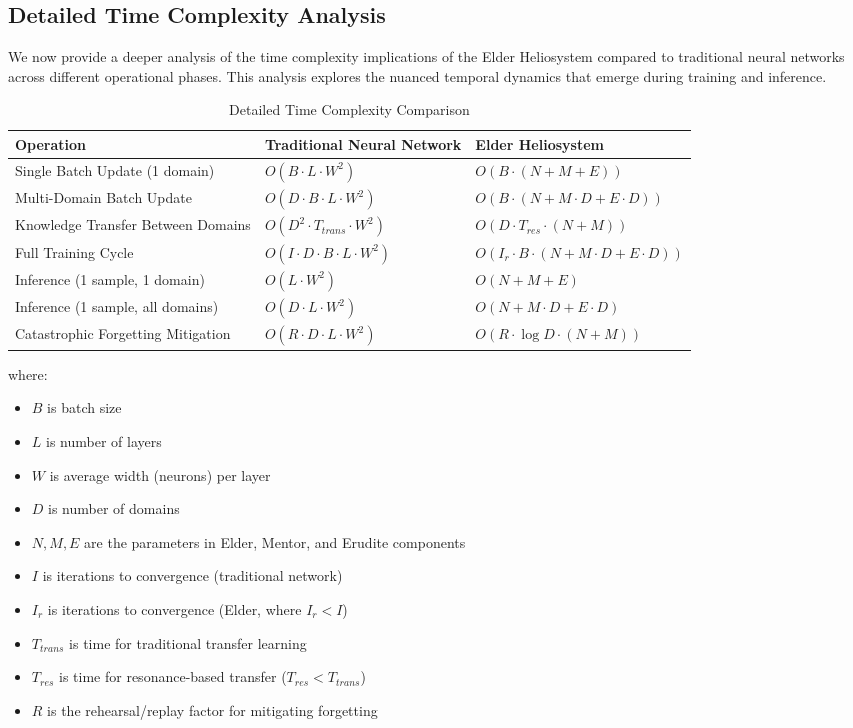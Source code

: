 \subsection{Detailed Time Complexity Analysis}

We now provide a deeper analysis of the time complexity implications of the Elder Heliosystem compared to traditional neural networks across different operational phases. This analysis explores the nuanced temporal dynamics that emerge during training and inference.

\begin{table}[h]
\centering
\small
\caption{Detailed Time Complexity Comparison}
\label{tab:time_complexity}
\begin{tabular}{|p{4cm}|p{5cm}|p{5cm}|}
\hline
\textbf{Operation} & \textbf{Traditional Neural Network} & \textbf{Elder Heliosystem} \\
\hline
Single Batch Update (1 domain) & $O(B \cdot L \cdot W^2)$ & $O(B \cdot (N + M + E))$ \\
\hline
Multi-Domain Batch Update & $O(D \cdot B \cdot L \cdot W^2)$ & $O(B \cdot (N + M \cdot D + E \cdot D))$ \\
\hline
Knowledge Transfer Between Domains & $O(D^2 \cdot T_{trans} \cdot W^2)$ & $O(D \cdot T_{res} \cdot (N + M))$ \\
\hline
Full Training Cycle & $O(I \cdot D \cdot B \cdot L \cdot W^2)$ & $O(I_r \cdot B \cdot (N + M \cdot D + E \cdot D))$ \\
\hline
Inference (1 sample, 1 domain) & $O(L \cdot W^2)$ & $O(N + M + E)$ \\
\hline
Inference (1 sample, all domains) & $O(D \cdot L \cdot W^2)$ & $O(N + M \cdot D + E \cdot D)$ \\
\hline
Catastrophic Forgetting Mitigation & $O(R \cdot D \cdot L \cdot W^2)$ & $O(R \cdot \log D \cdot (N + M))$ \\
\hline
\end{tabular}
\end{table}

\noindent where:
\begin{itemize}
    \item $B$ is batch size
    \item $L$ is number of layers
    \item $W$ is average width (neurons) per layer
    \item $D$ is number of domains
    \item $N, M, E$ are the parameters in Elder, Mentor, and Erudite components
    \item $I$ is iterations to convergence (traditional network)
    \item $I_r$ is iterations to convergence (Elder, where $I_r < I$)
    \item $T_{trans}$ is time for traditional transfer learning
    \item $T_{res}$ is time for resonance-based transfer ($T_{res} < T_{trans}$)
    \item $R$ is the rehearsal/replay factor for mitigating forgetting
\end{itemize}

